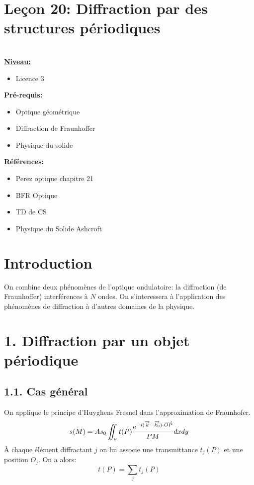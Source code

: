 \documentclass[french, a4paper, 10pt, twocolumn, landscape]{article}
\begin{document}
\section*{Leçon 20: Diffraction par des structures périodiques}

\hrulefill\\

\noindent\underline{\textbf{Niveau:}} 
\begin{itemize}
    \item Licence 3
\end{itemize}

\textbf{Pré-requis:}
\begin{itemize}
    \item Optique géométrique
    \item Diffraction de Fraunhoffer
    \item Physique du solide
\end{itemize}

\textbf{Références:}\medskip

\begin{itemize}
\item Perez optique chapitre 21
\item BFR Optique
\item TD de CS
\item Physique du Solide Ashcroft
\end{itemize}

\hrulefill


\section*{Introduction}

On combine deux phénomènes de l'optique ondulatoire: la diffraction (de Fraunhoffer) interférences à $N$ ondes. On s'interessera à l'application des phénomènes de diffraction à d'autres domaines de la physique.

\section*{1. Diffraction par un objet périodique}


\subsection*{1.1. Cas général}

On applique le principe d'Huyghens Fresnel dans l'approximation de Fraunhofer. 
\begin{equation}
    s(M) = As_0\iint_\sigma t(P)\dfrac{{\rm e}^{-i(\vec{k}-\vec{k_0})\cdot \vec{OP}}}{PM}dxdy
\end{equation}
À chaque élément diffractant $j$ on lui associe une transmittance  $t_j(P)$ et une position $O_j$. On a alors:
\begin{equation}
    t(P)=\sum_jt_j(P)
\end{equation}
\end{document}
